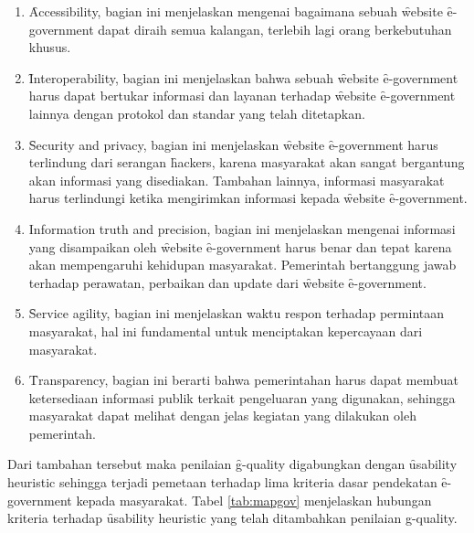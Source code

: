\begin{enumerate}
	\item \f{Accessibility}, bagian ini menjelaskan mengenai bagaimana sebuah \f{website} \f{e-government} dapat diraih semua kalangan, terlebih lagi orang berkebutuhan khusus.
	\item \f{Interoperability}, bagian ini menjelaskan bahwa sebuah \f{website} \f{e-government} harus dapat bertukar informasi dan layanan terhadap \f{website} \f{e-government} lainnya dengan protokol dan standar yang telah ditetapkan.
	\item \f{Security and privacy}, bagian ini menjelaskan \f{website} \f{e-government} harus terlindung dari serangan \f{hackers}, karena masyarakat akan sangat bergantung akan informasi yang disediakan. Tambahan lainnya, informasi masyarakat harus terlindungi ketika mengirimkan informasi kepada \f{website} \f{e-government}.
	\item Information truth and precision, bagian ini menjelaskan mengenai informasi yang disampaikan oleh \f{website} \f{e-government} harus benar dan tepat karena akan mempengaruhi kehidupan masyarakat. Pemerintah bertanggung jawab terhadap perawatan, perbaikan dan update dari \f{website} \f{e-government}.
	\item \f{Service agility}, bagian ini menjelaskan waktu respon terhadap permintaan masyarakat, hal ini fundamental untuk menciptakan kepercayaan dari masyarakat.
	\item \f{Transparency}, bagian ini berarti bahwa pemerintahan harus dapat membuat ketersediaan informasi publik terkait pengeluaran yang digunakan, sehingga masyarakat dapat melihat dengan jelas kegiatan yang dilakukan oleh pemerintah. 
\end{enumerate} 
Dari tambahan tersebut maka penilaian \f{g-quality} digabungkan dengan \f{usability heuristic} sehingga terjadi pemetaan terhadap lima kriteria dasar pendekatan \f{e-government} kepada masyarakat. Tabel \ref{tab:mapgov} menjelaskan hubungan kriteria terhadap \f{usability heuristic} yang telah ditambahkan penilaian g-quality.
